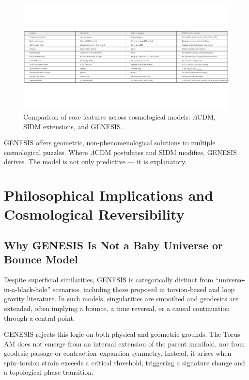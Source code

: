 \documentclass{article}
\begin{document}
\begin{figure}[h!]
  \centering
  \includegraphics[width=\textwidth]{GENESIS_model_comparison_table.png}
  \caption{Comparison of core features across cosmological models: $\Lambda$CDM, SIDM extensions, and GENESIS.}
  \label{fig:model_comparison_image}
\end{figure}


\begin{tcolorbox}[colback=gray!5, colframe=black!30, title=Why this matters]
GENESIS offers geometric, non-phenomenological solutions to multiple cosmological puzzles. Where $\Lambda$CDM postulates and SIDM modifies, GENESIS derives. The model is not only predictive — it is explanatory.
\end{tcolorbox}





\section{Philosophical Implications and Cosmological Reversibility} \subsection{Why GENESIS Is Not a Baby Universe or Bounce Model}

Despite superficial similarities, GENESIS is categorically distinct from “universe-in-a-black-hole” scenarios, including those proposed in torsion‑based and loop gravity literature. In such models, singularities are smoothed and geodesics are extended, often implying a bounce, a time reversal, or a causal continuation through a central point.

GENESIS rejects this logic on both physical and geometric grounds. The Torus AM does not emerge from an internal extension of the parent manifold, nor from geodesic passage or contraction–expansion symmetry. Instead, it arises when spin–torsion strain exceeds a critical threshold, triggering a signature change and a topological phase transition.
\end{document}
